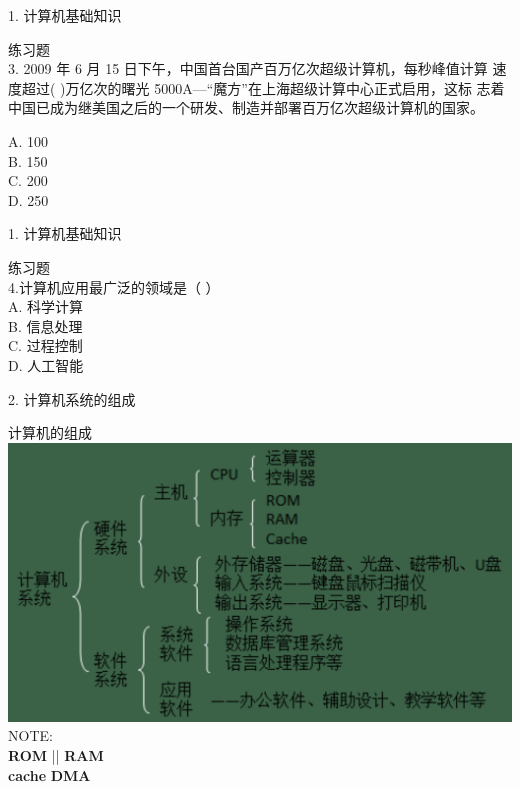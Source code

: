 \documentclass[aspectratio=169]{beamer}
\begin{document}
\begin{frame}[t]{1. 计算机基础知识} \vspace{20pt}

    练习题\\
            3. 2009 年 6 月 15 日下午，中国首台国产百万亿次超级计算机，每秒峰值计算
速度超过( )万亿次的曙光 5000A—“魔方”在上海超级计算中心正式启用，这标
志着中国已成为继美国之后的一个研发、制造并部署百万亿次超级计算机的国家。

            A. 100\\
            B. 150\\
            C. 200\\
            D. 250\\
\end{frame}

\begin{frame}[t]{1. 计算机基础知识} \vspace{20pt}

    练习题\\
    4.计算机应用最广泛的领域是（ ）\\
    A. 科学计算\\
    B. 信息处理\\
    C. 过程控制 \\
    D. 人工智能\\

\end{frame}



\begin{frame}[t]{2. 计算机系统的组成} \vspace{20pt}

    计算机的组成\\
    \includegraphics[scale=0.25]{computer_hardware}\\ 
    NOTE: \\
    \textbf{ROM} ||  \textbf{RAM}\\
    \textbf{cache} 
    \textbf{DMA} 
\end{frame}
\end{document}
